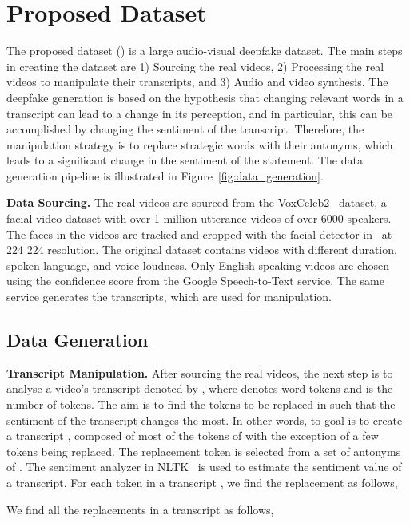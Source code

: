 \documentclass[conference, a4paper]{IEEEtran}
\begin{document}
\section{Proposed Dataset}
\label{sec:proposed_dataset}
The proposed dataset \dataset{} (\datasetabbr{}) is a large audio-visual deepfake dataset. The main steps in creating the dataset are 1) Sourcing the real videos, 2) Processing the real videos to manipulate their transcripts, and 3) Audio and video synthesis. The deepfake generation is based on the hypothesis that changing relevant words in a transcript can lead to a change in its perception, and in particular, this can be accomplished by changing the sentiment of the transcript. Therefore, the manipulation strategy is to replace strategic words with their antonyms, which leads to a significant change in the sentiment of the statement. The data generation pipeline is illustrated in Figure~\ref{fig:data_generation}.

\noindent \textbf{Data Sourcing.} The real videos are sourced from the VoxCeleb2~\cite{chung_voxceleb2_2018} dataset, a facial video dataset with over 1 million utterance videos of over 6000 speakers. The faces in the videos are tracked and cropped with the facial detector in~\cite{king_dlib-ml_2009} at 224 224 resolution. The original dataset contains videos with different duration, spoken language, and voice loudness. Only English-speaking videos are chosen using the confidence score from the Google Speech-to-Text service. The same service generates the transcripts, which are used for manipulation.

\subsection{Data Generation}
\noindent \textbf{Transcript Manipulation.} After sourcing the real videos, the next step is to analyse a video's transcript denoted by , where  denotes word tokens and  is the number of tokens. The aim is to find the tokens to be replaced in  such that the sentiment of the transcript changes the most. In other words, to goal is to create a transcript , composed of most of the tokens of  with the exception of a few tokens being replaced. The replacement token  is selected from a set  of antonyms of . The sentiment analyzer in NLTK~\cite{bird_natural_2009} is used to estimate the sentiment value   of a transcript. For each token  in a transcript , we find the replacement as follows,

We find all the replacements in a transcript  as follows,
\end{document}
